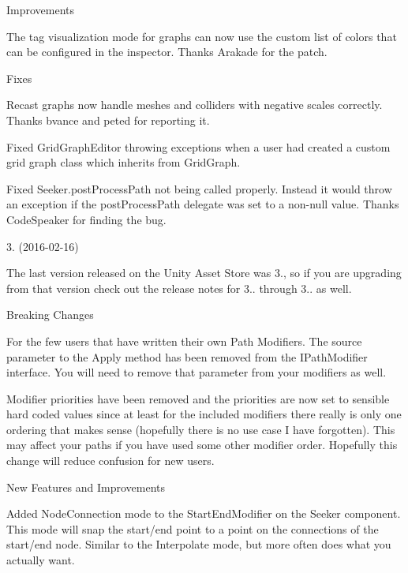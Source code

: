 \begin{DoxyItemize}
\begin{DoxyItemize}
\item Improvements
\begin{DoxyItemize}
\item The tag visualization mode for graphs can now use the custom list of colors that can be configured in the inspector. Thanks Arakade for the patch.
\end{DoxyItemize}
\item Fixes
\begin{DoxyItemize}
\item Recast graphs now handle meshes and colliders with negative scales correctly. Thanks bvance and peted for reporting it.
\item Fixed Grid\+Graph\+Editor throwing exceptions when a user had created a custom grid graph class which inherits from Grid\+Graph.
\item Fixed Seeker.\+post\+Process\+Path not being called properly. Instead it would throw an exception if the post\+Process\+Path delegate was set to a non-\/null value. Thanks Code\+Speaker for finding the bug.
\end{DoxyItemize}
\end{DoxyItemize}
\item 3. (2016-\/02-\/16)
\begin{DoxyItemize}
\item The last version released on the Unity Asset Store was 3., so if you are upgrading from that version check out the release notes for 3.. through 3.. as well.
\item Breaking Changes
\begin{DoxyItemize}
\item For the few users that have written their own Path Modifiers. The \textquotesingle{}source\textquotesingle{} parameter to the Apply method has been removed from the I\+Path\+Modifier interface. You will need to remove that parameter from your modifiers as well.
\item Modifier priorities have been removed and the priorities are now set to sensible hard coded values since at least for the included modifiers there really is only one ordering that makes sense (hopefully there is no use case I have forgotten). This may affect your paths if you have used some other modifier order. Hopefully this change will reduce confusion for new users.
\end{DoxyItemize}
\item New Features and Improvements
\begin{DoxyItemize}
\item Added Node\+Connection mode to the Start\+End\+Modifier on the Seeker component. This mode will snap the start/end point to a point on the connections of the start/end node. Similar to the Interpolate mode, but more often does what you actually want.

\end{DoxyItemize}
\end{DoxyItemize}
\end{DoxyItemize}
